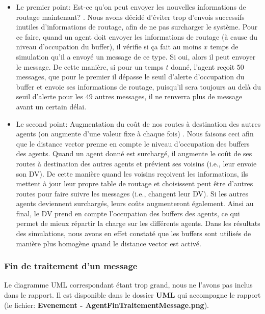 \documentclass[a4paper,11pt]{article}
\begin{document}
\begin{itemize}
 \item Le premier point: \og Est-ce qu'on peut envoyer les nouvelles informations de routage maintenant? \fg. Nous avons décidé d'éviter trop d'envois successifs inutiles d'informations de routage, afin de ne pas surcharger le système. Pour ce faire, quand un agent doit envoyer les informations de routage (à cause du niveau d'occupation du buffer), il vérifie si ça fait au moins $x$ temps de simulation qu'il a envoyé un message de ce type. Si oui, alors il peut envoyer le message. De cette manière, si pour un temps $t$ donné, l'agent reçoit $50$ messages, que pour le premier il dépasse le seuil d'alerte d'occupation du buffer et envoie ses informations de routage, puisqu'il sera toujours au delà du seuil d'alerte pour les $49$ autres messages, il ne renverra plus de message avant un certain délai.
 
 \item Le second point: \og Augmentation du coût de nos routes à destination des autres agents (on augmente d'une valeur fixe à chaque fois) \fg. Nous faisons ceci afin que le distance vector prenne en compte le niveau d'occupation des buffers des agents. Quand un agent donné est surchargé, il augmente le coût de ses routes à destination des autres agents et prévient ses voisins (i.e., leur envoie son DV). De cette manière quand les voisins reçoivent les informations, ils mettent à jour leur propre table de routage et choisissent peut être d'autres routes pour faire suivre les messages (i.e., changent leur DV). Si les autres agents deviennent surchargés, leurs coûts augmenteront également. Ainsi au final, le DV prend en compte l'occupation des buffers des agents, ce qui permet de mieux répartir la charge sur les différents agents. Dans les résultats des simulations, nous avons en effet constaté que les buffers sont utilisés de manière plus homogène quand le distance vector est activé.
\end{itemize}





\subsubsection{Fin de traitement d'un message}
Le diagramme UML correspondant étant trop grand, nous ne l'avons pas inclus dans le rapport. Il est disponible dans le dossier \textbf{UML} qui accompagne le rapport (le fichier: \textbf{Evenement - AgentFinTraitementMessage.png}).
\end{document}
